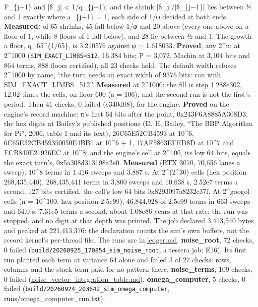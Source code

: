 \begin{description}
F\_\allowbreak{}\{j+1\} and |δ\_\allowbreak{}j| < 1/q\_\allowbreak{}\{j+1\}; and the shrink |δ\_\allowbreak{}j|/|δ\_\allowbreak{}\{j−1\}| lies between ½ and 1 exactly where a\_\allowbreak{}\{j+1\} = 1, each side of 1/φ decided at both ends. \textbf{Measured:} of 65 shrinks, 45 fall below 1/φ and 20 above (every one above on a floor of 1, while 8 floors of 1 fall below), and 28 lie between ½ and 1. The growth a floor, q\_\allowbreak{}65\textasciicircum{}\{1/65\}, is 3.210576 against φ = 1.618033. \textbf{Proved}, any 2\textasciicircum{}n: at 2\textasciicircum{}1000 (\texttt{SIM\_\allowbreak{}EXACT\_\allowbreak{}LIMBS=512}, 16,384 bits; P = 3,072, Machin at 3,104 bits and 864 terms, 888 floors certified), all 23 checks hold. The default width refuses 2\textasciicircum{}1000 by name, “the turn needs an exact width of 9376 bits: run with SIM\_\allowbreak{}EXACT\_\allowbreak{}LIMBS=512”. \textbf{Measured} at 2\textasciicircum{}1000: the fill is step 1.288e302, 12.02 times the cells, on floor 600 (a = 106), and the second run is not the first's period. Then 41 checks, 0 failed (e340d08), for the engine. \textbf{Proved} on the engine's record machine: π's first 64 bits after the point, 0x243F6A8885A308D3; the hex digits at Bailey's published positions (D. H. Bailey, “The BBP Algorithm for Pi”, 2006, table 1 and its text), 26C65E52CB4593 at 10\textasciicircum{}6, 6C65E52CB459350050E4BB1 at 10\textasciicircum{}6 + 1, 17AF5863EFED8D at 10\textasciicircum{}7 and ECB840E21926EC at 10\textasciicircum{}8; and the engine's cell at 2\textasciicircum{}100, its low 64 bits, equals the exact turn's, 0x5a308d313198a2e0. \textbf{Measured} (RTX 3070, 70,656 lanes a sweep): 10\textasciicircum{}8 terms in 1,416 sweeps and 3.887 s. At 2\textasciicircum{}(2\textasciicircum{}30) cells (hex position 268,435,440), 268,435,441 terms in 3,800 sweeps and 10.638 s, 2.52e7 terms a second, 127 bits certified, the cell's low 64 bits 0x8293097a8232c37f. At 2\textasciicircum{}googol cells (n = 10\textasciicircum{}100, hex position 2.5e99), 46,844,928 of 2.5e99 terms in 663 sweeps and 64.0 s, 7.31e5 terms a second, about 1.08e86 years at that rate; the run was stopped, and no digit at that depth was printed. The job declared 3,413,540 bytes and peaked at 221,413,376: the declaration counts the sim's own buffers, not the record kernel's per-thread file. The runs are in \hyperref[chap:ledger]{ledger.md}. \textbf{noise\_\allowbreak{}root}, 72 checks, 0 failed (\texttt{build/\allowbreak{}20260925\_\allowbreak{}170854\_\allowbreak{}sim\_\allowbreak{}noise\_\allowbreak{}root}, a tessera job; E16). Its first run planted each term at variance 64 alone and failed 3 of 27 checks: rows, columns and the stack term paid for no pattern there. \textbf{noise\_\allowbreak{}terms}, 109 checks, 0 failed (\hyperref[chap:noise-vector-integration-table]{noise\_\allowbreak{}vector\_\allowbreak{}integration\_\allowbreak{}table.md}). \textbf{omega\_\allowbreak{}computer}, 5 checks, 0 failed (\texttt{build/\allowbreak{}20260924\_\allowbreak{}203642\_\allowbreak{}sim\_\allowbreak{}omega\_\allowbreak{}computer}, runs/omega\_\allowbreak{}computer\_\allowbreak{}run.txt).

\end{description}
